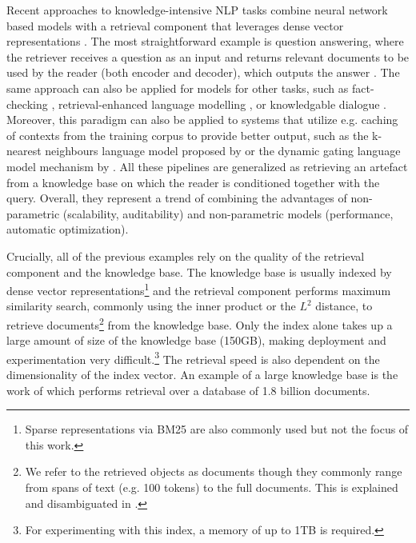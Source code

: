 Recent approaches to knowledge-intensive NLP tasks combine neural network based models with a retrieval component that leverages dense vector representations \citep{guu2020realm,lewis2020retrieval,petroni2021kilt}.
The most straightforward example is question answering, where the retriever receives a question as an input and returns relevant documents to be used by the reader (both encoder and decoder), which outputs the answer \citep{nadeem2019fakta,chen2020neural}.
The same approach can also be applied for models for other tasks, such as fact-checking \citep{tchechmedjiev2019claimskg}, retrieval-enhanced language modelling \citep{logan2019baracks,borgeaud2021improving,he2021efficient}, or knowledgable dialogue \citep{dinan2018wizard,wu2020topicka}.
Moreover, this paradigm can also be applied to systems that utilize e.g. caching of contexts from the training corpus to provide better output, such as the k-nearest neighbours language model proposed by \citet{khandelwal2019generalization} or the dynamic gating language model mechanism by \citet{yogatama2021adaptive}.
All these pipelines are generalized as retrieving an artefact from a knowledge base \citep{zouhar2021artefact} on which the reader is conditioned together with the query.
Overall, they represent a trend of combining the advantages of non-parametric (scalability, auditability) and non-parametric models (performance, automatic optimization).

Crucially, all of the previous examples rely on the quality of the retrieval component and the knowledge base.
The knowledge base is usually indexed by dense vector representations\footnote{Sparse representations via BM25 \citep{robertson1995okapi} are also commonly used but not the focus of this work.} and the retrieval component performs maximum similarity search, commonly using the inner product or the $L^2$ distance, to retrieve documents\footnote{We refer to the retrieved objects as documents though they commonly range from spans of text (e.g. 100 tokens) to the full documents.
    This is explained and disambiguated in .} from the knowledge base.
Only the index alone takes up a large amount of size of the knowledge base (150GB), making deployment and experimentation very difficult.\footnote{For experimenting with this index, a memory of up to 1TB is required.}
The retrieval speed is also dependent on the dimensionality of the index vector.
An example of a large knowledge base is the work of \citet{borgeaud2021improving} which performs retrieval over a database of 1.8 billion documents.

